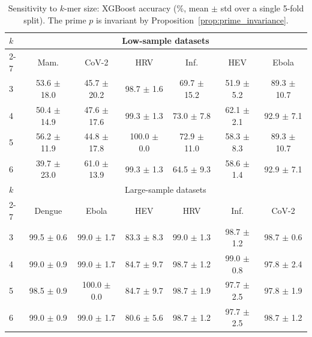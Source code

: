 \begin{table}[t]
\centering
\footnotesize
\caption{Sensitivity to $k$-mer size: XGBoost accuracy (\%, mean $\pm$ std over a single 5-fold split). The prime $p$ is invariant by Proposition~\ref{prop:prime_invariance}.}
\label{tab:sens}
\setlength{\tabcolsep}{3pt}
\begin{tabular}{lcccccc}
\hline
$k$ & \multicolumn{6}{c}{Low-sample datasets} \\
\cline{2-7}
 & Mam. & CoV-2 & HRV & Inf. & HEV & Ebola \\
\hline
3 & 53.6 $\pm$ 18.0 & 45.7 $\pm$ 20.2 & 98.7 $\pm$ 1.6 & 69.7 $\pm$ 15.2 & 51.9 $\pm$ 5.2 & 89.3 $\pm$ 10.7 \\
4 & 50.4 $\pm$ 14.9 & 47.6 $\pm$ 17.6 & 99.3 $\pm$ 1.3 & 73.0 $\pm$ 7.8 & 62.1 $\pm$ 2.1 & 92.9 $\pm$ 7.1 \\
5 & 56.2 $\pm$ 11.9 & 44.8 $\pm$ 17.8 & 100.0 $\pm$ 0.0 & 72.9 $\pm$ 11.0 & 58.3 $\pm$ 8.3 & 89.3 $\pm$ 10.7 \\
6 & 39.7 $\pm$ 23.0 & 61.0 $\pm$ 13.9 & 99.3 $\pm$ 1.3 & 64.5 $\pm$ 9.3 & 58.6 $\pm$ 1.4 & 92.9 $\pm$ 7.1 \\
\hline
$k$ & \multicolumn{6}{c}{Large-sample datasets} \\
\cline{2-7}
 & Dengue & Ebola & HEV & HRV & Inf. & CoV-2 \\
\hline
3 & 99.5 $\pm$ 0.6 & 99.0 $\pm$ 1.7 & 83.3 $\pm$ 8.3 & 99.0 $\pm$ 1.3 & 98.7 $\pm$ 1.2 & 98.7 $\pm$ 0.6 \\
4 & 99.0 $\pm$ 0.9 & 99.0 $\pm$ 1.7 & 84.7 $\pm$ 9.7 & 98.7 $\pm$ 1.2 & 99.0 $\pm$ 0.8 & 97.8 $\pm$ 2.4 \\
5 & 98.5 $\pm$ 0.9 & 100.0 $\pm$ 0.0 & 84.7 $\pm$ 9.7 & 98.7 $\pm$ 1.9 & 97.7 $\pm$ 2.5 & 97.8 $\pm$ 1.9 \\
6 & 99.0 $\pm$ 0.9 & 99.0 $\pm$ 1.7 & 80.6 $\pm$ 5.6 & 98.7 $\pm$ 1.2 & 97.7 $\pm$ 2.5 & 98.7 $\pm$ 1.2 \\
\hline
\end{tabular}
\end{table}
